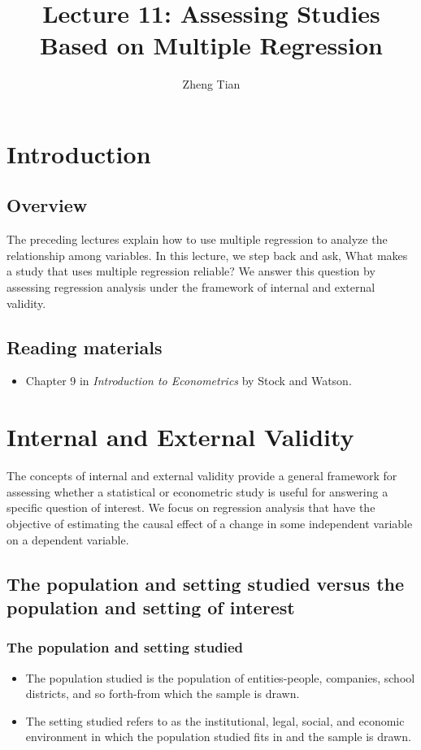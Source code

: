 \documentclass[a4paper,11pt]{article}
\author{Zheng Tian}
\date{}
\title{Lecture 11: Assessing Studies Based on Multiple Regression}
\begin{document}
\maketitle

\section{Introduction}
\label{sec:orgcaeaad6}
\subsection{Overview}
\label{sec:org91b551e}
The preceding lectures explain how to use multiple regression to
analyze the relationship among variables. In this lecture, we step
back and ask, What makes a study that uses multiple regression
reliable? We answer this question by assessing regression analysis
under the framework of internal and external validity. 

\subsection{Reading materials}
\label{sec:org8bb5631}
\begin{itemize}
\item Chapter 9 in \emph{Introduction to Econometrics} by Stock and Watson.
\end{itemize}

\section{Internal and External Validity}
\label{sec:orge8f148b}
The concepts of internal and external validity provide a general
framework for assessing whether a statistical or econometric study is
useful for answering a specific question of interest. We focus on
regression analysis that have the objective of estimating the causal
effect of a change in some independent variable on a dependent
variable. 

\subsection{The population and setting studied versus the population and setting of interest}
\label{sec:org1defef8}
\subsubsection*{The population and setting studied}
\label{sec:org27deca3}
\begin{itemize}
\item The population studied is the population of entities-people,
companies, school districts, and so forth-from which the sample is
drawn.
\item The setting studied refers to as the institutional, legal, social,
and economic environment in which the population studied fits in and
the sample is drawn.
\end{itemize}
\end{document}
